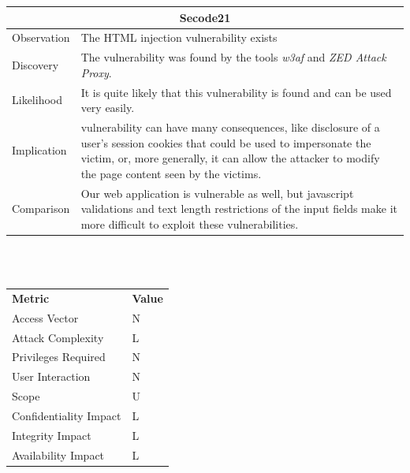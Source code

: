 \documentclass[headsepline,footsepline,footinclude=false,oneside,fontsize=11pt,paper=a4,listof=totoc,bibliography=totoc]{scrbook} %
\begin{document}
\begin{tabular}{ l|p{11cm}  }
	\hline
	\multicolumn{2}{c}{\textbf{Secode21}} \\
	\hline
	Observation   & The HTML injection vulnerability exists  \\
	Discovery  & The vulnerability was found by the tools \textit{w3af} and \textit{ZED Attack Proxy}. \\
	Likelihood & It is quite likely that this vulnerability is found and can be used very easily. \\
	Implication    &  vulnerability can have many consequences, like disclosure of a user's session cookies that could be used to impersonate the victim, or, more generally, it can allow the attacker to modify the page content seen by the victims. \\
	Comparison & Our web application is vulnerable as well, but javascript validations and text length restrictions of the input fields make it more difficult to exploit these vulnerabilities. \\
	\hline
\end{tabular}
\\
\vspace{0.5cm}
\\
\begin{center}
	\begin{tabular}{ll}
		\rowcolor[HTML]{34CDF9}
		{\color[HTML]{ECF4FF} \textbf{Metric}}        & {\color[HTML]{ECF4FF} \textbf{Value}} \\
		\rowcolor[HTML]{BBDAFF}
		{\color[HTML]{333333} Access Vector}          & {\color[HTML]{333333} } N              \\
		\rowcolor[HTML]{ECF4FF}
		{\color[HTML]{333333} Attack Complexity}      & {\color[HTML]{333333} } L              \\
		\rowcolor[HTML]{BBDAFF}
		{\color[HTML]{333333} Privileges Required}    & {\color[HTML]{333333} } N              \\
		\rowcolor[HTML]{ECF4FF}
		{\color[HTML]{333333} User Interaction}       & {\color[HTML]{333333} } N              \\
		\rowcolor[HTML]{BBDAFF}
		{\color[HTML]{333333} Scope}                  & {\color[HTML]{333333} } U              \\
		\rowcolor[HTML]{ECF4FF}
		{\color[HTML]{333333} Confidentiality Impact} & {\color[HTML]{333333} } L              \\
		\rowcolor[HTML]{BBDAFF}
		{\color[HTML]{333333} Integrity Impact}       & {\color[HTML]{333333} } L              \\
		\rowcolor[HTML]{ECF4FF}
		{\color[HTML]{333333} Availability Impact}    & {\color[HTML]{333333} } L
	\end{tabular}
\end{center}
\pagebreak
\end{document}
